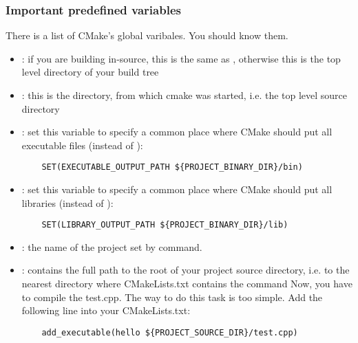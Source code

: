 \subsubsection{Important predefined variables}
There is a list of CMake’s global varibales. You should know them.
\begin{itemize}
    \item {}: if you are building in-source, this is the same as , otherwise this is the top level directory of your build tree
    \item {}: this is the directory, from which cmake was started, i.e. the top level source directory
    \item {}: set this variable to specify a common place where CMake should put all executable files (instead of ):
    \begin{lstlisting}
    SET(EXECUTABLE_OUTPUT_PATH ${PROJECT_BINARY_DIR}/bin)
    \end{lstlisting}
    \item {}: set this variable to specify a common place where CMake should put all libraries (instead of ):
    \begin{lstlisting}
    SET(LIBRARY_OUTPUT_PATH ${PROJECT_BINARY_DIR}/lib)
    \end{lstlisting}
    \item {}: the name of the project set by  command.
    \item {}: contains the full path to the root of your project source directory, i.e. to the nearest directory where CMakeLists.txt contains the  command Now, you have to compile the test.cpp. The way to do this task is too simple. Add the following line into your CMakeLists.txt:
    \begin{lstlisting}
    add_executable(hello ${PROJECT_SOURCE_DIR}/test.cpp)
    \end{lstlisting}
\end{itemize}
    



        



    




    





    




